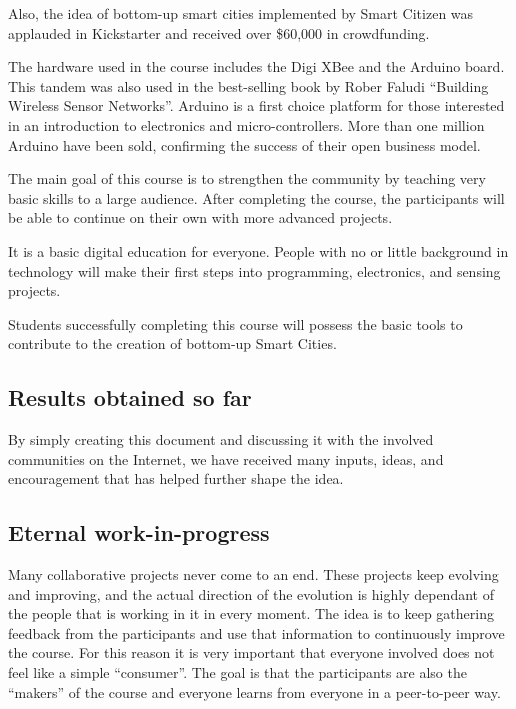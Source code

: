 \documentclass[a4paper,oneside]{book}   %
\begin{document}
Also, the idea of bottom-up smart cities implemented by Smart Citizen was applauded in Kickstarter and received over \$60,000 in crowdfunding. 

The hardware used in the course includes the Digi XBee and the Arduino board. 
This tandem was also used in the best-selling book by Rober Faludi ``Building Wireless Sensor Networks''.
Arduino is a first choice platform for those interested in an introduction to electronics and micro-controllers.
More than one million Arduino have been sold, confirming the success of their open business model.

The main goal of this course is to strengthen the community by teaching very basic skills to a large audience. After completing the course, the participants will be able to continue on their own with more advanced projects. 

It is a basic digital education for everyone. People with no or little background in technology will make their first steps into programming, electronics, and sensing projects.

Students successfully completing this course will possess the basic tools to contribute to the creation of bottom-up Smart Cities.

\subsection{Results obtained so far}

By simply creating this document and discussing it with the involved communities on the Internet, we have received many inputs, ideas, and encouragement that has helped further shape the idea.

\subsection{Eternal work-in-progress}

Many collaborative projects never come to an end.
These projects keep evolving and improving, and the actual direction of the evolution is highly dependant of the people that is working in it in every moment.
The idea is to keep gathering feedback from the participants and use that information to continuously improve the course.
For this reason it is very important that everyone involved does not feel like a simple ``consumer''.
The goal is that the participants are also the ``makers'' of the course and everyone learns from everyone in a peer-to-peer way.
\end{document}
